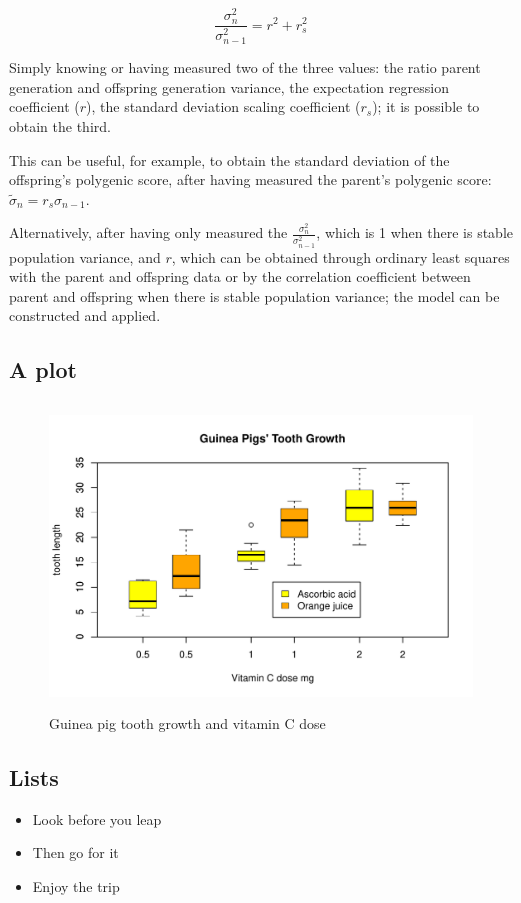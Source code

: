 \documentclass[a4paper,11pt]{article}
\begin{document}
$$\frac{\sigma_n^2}{\sigma_{n-1}^2} = r^2+r_s^2$$

Simply knowing or having measured two of the three values: the ratio parent generation and offspring generation variance, the expectation regression coefficient ($r$), the standard deviation scaling coefficient ($r_s$); it is possible to obtain the third.

This can be useful, for example, to obtain the standard deviation of the offspring's polygenic score, after having measured the parent's polygenic score: $\tilde{\sigma}_n = r_s \sigma_{n-1}$.

Alternatively, after having only measured the $\frac{\sigma_n^2}{\sigma_{n-1}^2}$, which is 1 when there is stable population variance, and $r$, which can be obtained through ordinary least squares with the parent and offspring data or by the correlation coefficient between parent and offspring when there is stable population variance; the model can be constructed and applied.




\subsection{A plot}
\begin{figure}[htb]
\centering
\includegraphics[width=4.8in, height=3.2in]{GuineaPigPlot.pdf}
\caption{Guinea pig tooth growth and vitamin C dose}
\label{fig:GPPlot}
\end{figure}

\subsection{Lists}
\begin{itemize}
\item Look before you leap
\item Then go for it
\item Enjoy the trip
\end{itemize}
\end{document}
